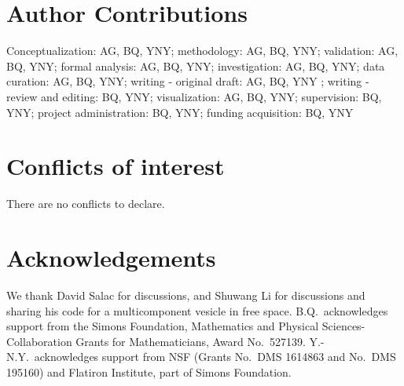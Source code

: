\documentclass[twoside,twocolumn,9pt]{article}
\renewcommand{\refname}{Notes and references}
\begin{document}
\section*{Author Contributions}
Conceptualization: AG, BQ, YNY; methodology: AG, BQ, YNY; validation:
AG, BQ, YNY; formal analysis: AG, BQ, YNY; investigation: AG, BQ, YNY;
data curation: AG, BQ, YNY; writing - original
draft: AG, BQ, YNY ; writing - review and editing: BQ, YNY;
visualization: AG, BQ, YNY; supervision: BQ, YNY; project administration: BQ,
YNY; funding acquisition: BQ, YNY

\section*{Conflicts of interest}
There are no conflicts to declare.

\section*{Acknowledgements}
We thank David Salac  for discussions, and Shuwang Li for discussions and sharing his code for a multicomponent vesicle in free space. 
B.Q.~acknowledges support from the Simons Foundation, Mathematics and Physical
Sciences-Collaboration Grants for Mathematicians, Award No.~527139.
Y.-N.Y.~acknowledges support from NSF (Grants No.~DMS 1614863 and
No.~DMS 195160) and Flatiron Institute, part of Simons Foundation.



\balance


\end{document}
